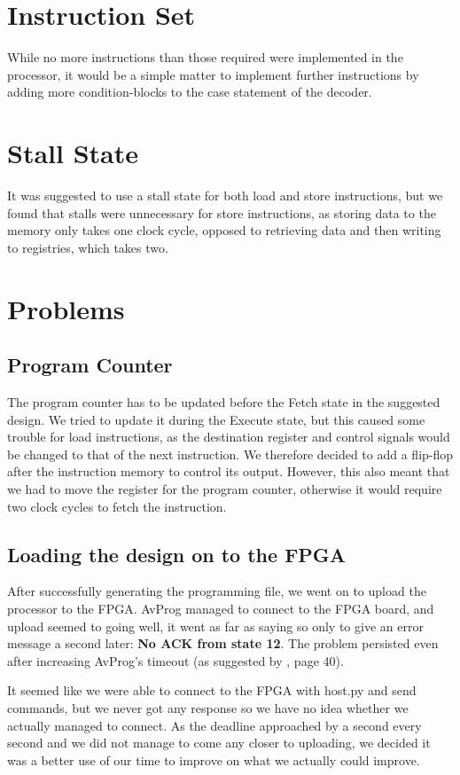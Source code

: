 \section{Instruction Set}

While no more instructions than those required were implemented in the processor, it would be a simple matter to implement further instructions by adding more condition-blocks to the case statement of the decoder.

\section{Stall State}

It was suggested to use a stall state for both load and store instructions, but we found that stalls were unnecessary for store instructions, as storing data to the memory only takes one clock cycle, opposed to retrieving data and then writing to registries, which takes two.

\section{Problems}

\subsection{Program Counter}

The program counter has to be updated before the Fetch state in the suggested design. We tried to update it during the Execute state, but this caused some trouble for load instructions, as the destination register and control signals would be changed to that of the next instruction. We therefore decided to add a flip-flop after the instruction memory to control its output. However, this also meant that we had to move the register for the program counter, otherwise it would require two clock cycles to fetch the instruction.

\subsection{Loading the design on to the FPGA}
\label{subsec:uploadproblems}

After successfully generating the programming file, we went on to upload the processor to the FPGA.
AvProg managed to connect to the FPGA board, and upload seemed to going well, it went as far as saying so only to give an error message a second later: \textbf{No ACK from state 12}.
The problem persisted even after increasing AvProg's timeout (as suggested by \cite{avnet-programming-user-manual}, page 40).

It seemed like we were able to connect to the FPGA with host.py and send commands, but we never got any response so we have no idea whether we actually managed to connect.
As the deadline approached by a second every second and we did not manage to come any closer to uploading, we decided it was a better use of our time to improve on what we actually could improve.

